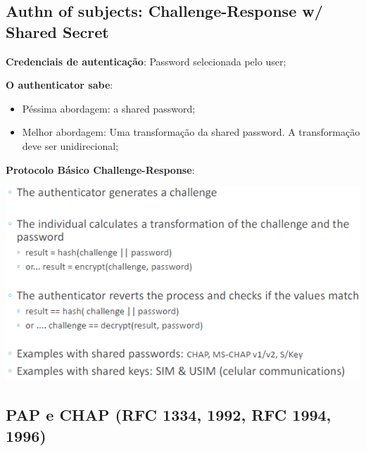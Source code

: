 \documentclass{article}
\begin{document}
\subsection{Authn of subjects: Challenge-Response w/ Shared Secret}

\begin{flushleft}
  \textbf{Credenciais de autenticação}: Password selecionada pelo user;

  \vspace{2mm}

  \textbf{O authenticator sabe}:
  \begin{itemize}
    \item Péssima abordagem: a shared password;
    \item Melhor abordagem: Uma transformação da shared password.
    A transformação deve ser unidirecional;
  \end{itemize}

  \pagebreak

  \textbf{Protocolo Básico Challenge-Response}:

  \begin{center}
    \includegraphics[scale=0.6]{24}
  \end{center}
\end{flushleft}

\subsection{PAP e CHAP (RFC 1334, 1992, RFC 1994, 1996)}
\end{document}
